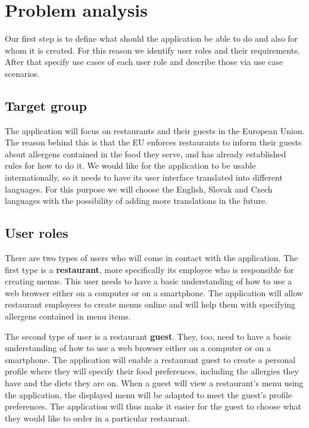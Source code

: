 \chapter{Problem analysis}
Our first step is to define what should the application be able to do and also for whom it is created.
For this reason we identify user roles and their requirements. 
After that specify use cases of each user role and describe those via use case scenarios.

\section{Target group}
The application will focus on restaurants and their guests in the European Union.
The reason behind this is that the EU enforces restaurants to inform their guests about allergens contained in the food they serve, and has already established rules for how to do it.
We would like for the application to be usable internationally, so it needs to have its user interface translated into different languages.
For this purpose we will choose the English, Slovak and Czech languages with the possibility of adding more translations in the future.


\section{User roles}
There are two types of users who will come in contact with the application.
The first type is a \textbf{restaurant}, more specifically its employee who is responsible for creating menus.
This user needs to have a basic understanding of how to use a web browser either on a computer or on a smartphone.
The application will allow restaurant employees to create menus online and will help them with specifying allergens contained in menu items.

The second type of user is a restaurant \textbf{guest}.
They, too, need to have a basic understanding of how to use a web browser either on a computer or on a smartphone.
The application will enable a restaurant guest to create a personal profile where they will specify their food preferences, including the allergies they have and the diets they are on.
When a guest will view a restaurant's menu using the application, the displayed menu will be adapted to meet the guest's profile preferences.
The application will thus make it easier for the guest to choose what they would like to order in a particular restaurant.

